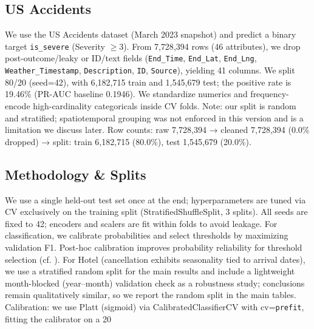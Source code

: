 \documentclass[conference]{IEEEtran}
\newcommand{\datasetB}{US Accidents}
\newcommand{\seed}{42}
\begin{document}
\subsection{\datasetB}
We use the US Accidents dataset (March 2023 snapshot) \cite{MoosaviUSAccidentsKaggle} and predict a binary target \texttt{is\_severe} (Severity $\geq 3$). From 7{,}728{,}394 rows (46 attributes), we drop post-outcome/leaky or ID/text fields (\texttt{End\_Time}, \texttt{End\_Lat}, \texttt{End\_Lng}, \texttt{Weather\_Timestamp}, \texttt{Description}, \texttt{ID}, \texttt{Source}), yielding 41 columns. We split 80/20 (seed=\seed), with 6{,}182{,}715 train and 1{,}545{,}679 test; the positive rate is 19.46\% (PR-AUC baseline 0.1946). We standardize numerics and frequency-encode high-cardinality categoricals inside CV folds. Note: our split is random and stratified; spatiotemporal grouping was not enforced in this version and is a limitation we discuss later.
Row counts: raw 7{,}728{,}394 → cleaned 7{,}728{,}394 (0.0\% dropped) → split: train 6{,}182{,}715 (80.0\%), test 1{,}545{,}679 (20.0\%).

\subsection{Methodology \& Splits}
We use a single held-out test set once at the end; hyperparameters are tuned via CV exclusively on the training split (StratifiedShuffleSplit, 3 splits). All seeds are fixed to \seed{}; encoders and scalers are fit within folds to avoid leakage. For classification, we calibrate probabilities and select thresholds by maximizing validation F1. Post-hoc calibration improves probability reliability for threshold selection (cf. \cite{Kull2019DirichletCal}). For Hotel (cancellation exhibits seasonality tied to arrival dates), we use a stratified random split for the main results and include a lightweight month-blocked (year–month) validation check as a robustness study; conclusions remain qualitatively similar, so we report the random split in the main tables. Calibration: we use Platt (sigmoid) via CalibratedClassifierCV with cv=\texttt{prefit}, fitting the calibrator on a 20%
\end{document}
